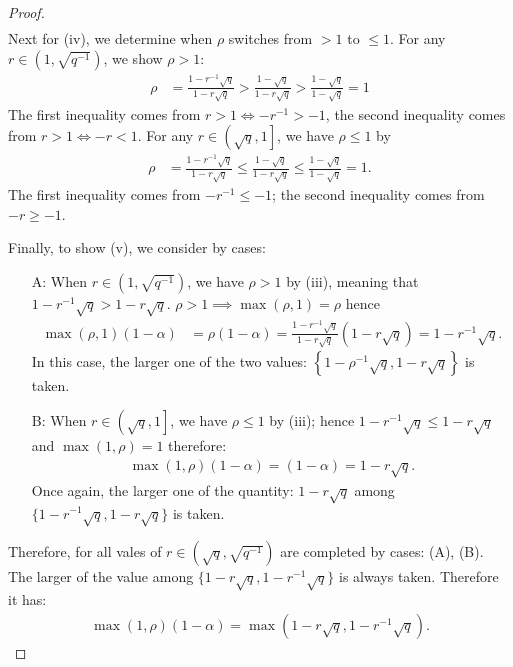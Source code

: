 \documentclass[12pt]{article}
\begin{document}
\begin{proof}
\begin{align*}
        \end{align*}
        Next for (iv), we determine when $\rho$ switches from $> 1$ to $ \le 1$. 
        For any $r \in \left(1, \sqrt{q^{-1}}\right)$, we show $\rho > 1$: 
        \begin{align*}
            \rho &= \frac{1 - r^{-1}\sqrt{q}}{1 - r \sqrt{q}} 
            > \frac{1 - \sqrt{q}}{1 - r \sqrt{q}} > \frac{1 - \sqrt{q}}{1 - \sqrt{q}} = 1
        \end{align*}
        The first inequality comes from $r > 1 \iff -r^{-1} > -1$, the second inequality comes from $r > 1 \iff -r < 1$. 
        For any $r \in \left(\sqrt{q}, 1\right]$, we have $\rho \le 1$ by 
        \begin{align*}
            \rho &= \frac{1 - r^{-1}\sqrt{q}}{1 - r \sqrt{q}} 
            \le \frac{1 - \sqrt{q}}{1 - r \sqrt{q}} \le \frac{1 - \sqrt{q}}{1 - \sqrt{q}} = 1. 
        \end{align*}
        The first inequality comes from $-r^{-1} \le - 1$; the second inequality comes from $-r \ge -1$. 
        \par
        Finally, to show (v), we consider by cases: 
        \begin{enumerate}
            \item[A:] When $r \in \left(1, \sqrt{q^{-1}}\right)$, we have $\rho > 1$ by (iii), meaning that $1 - r^{-1}\sqrt{q} > 1 - r \sqrt{q}$. $\rho > 1 \implies \max(\rho, 1) = \rho$ hence 
                \begin{align*}
                    \max(\rho, 1)(1 - \alpha) &= \rho(1- \alpha)
                    = \frac{1 - r^{-1}\sqrt{q}}{1 - r \sqrt{q}}(1 - r \sqrt{q}) = 1 - r^{-1}\sqrt{q}. 
                \end{align*}
                In this case, the larger one of the two values: $\left\lbrace1 - \rho^{-1}\sqrt{q}, 1 - r\sqrt{q}\right\rbrace$ is taken. 
            \item[B:] When $r \in \left(\sqrt{q}, 1\right]$, we have $\rho \le 1$ by (iii); hence $1 - r^{-1}\sqrt{q} \le 1 - r \sqrt{q}$ and $\max(1,\rho) = 1$ therefore: 
            \begin{align*}
                \max(1, \rho)(1 - \alpha) = (1 - \alpha) = 1 - r \sqrt{q}. 
            \end{align*}
            Once again, the larger one of the quantity: $1 - r \sqrt{q}$ among $\{1 - r^{-1}\sqrt{q}, 1 - r\sqrt{q}\}$ is taken. 
        \end{enumerate}
        Therefore, for all vales of $r \in \left(\sqrt{q}, \sqrt{q^{-1}}\right)$ are completed by cases: (A), (B).
        The larger of the value among $\{1 - r \sqrt{q}, 1 - r^{-1}\sqrt{q}\}$ is always taken. 
        Therefore it has: 
        \begin{align*}
            \max(1, \rho)(1 - \alpha) = \max\left(1 - r\sqrt{q}, 1 - r^{-1}\sqrt{q}\right). 
        \end{align*}

    \end{proof}
\end{document}
